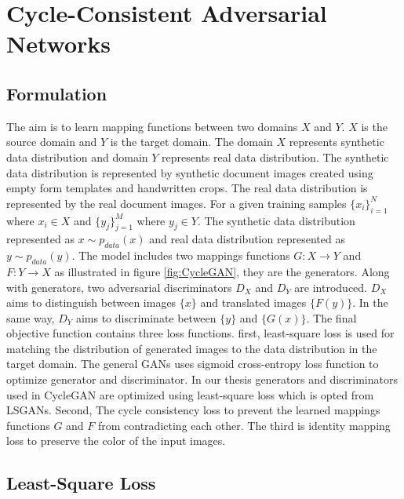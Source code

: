 \section{Cycle-Consistent Adversarial Networks}\label{CycleConsistentAdversarialNetworks}


\subsection{Formulation}


The aim is to learn mapping functions between two domains $X$ and $Y$. $X$ is the source domain and $Y$ is the target domain. The domain $X$ represents synthetic data distribution and domain $Y$ represents real data distribution. The synthetic data distribution is represented by synthetic document images created using empty form templates and handwritten crops. The real data distribution is represented by the real document images. For a given training samples $\{x_i\}_{i=1}^{N}$ where $x_i \in X$ and $\{y_j\}_{j=1}^{M}$ where $y_j \in Y$. The synthetic data distribution represented as $x \sim p_{data}(x)$ and real data distribution represented as $y \sim p_{data}(y)$. The model includes two mappings functions $G : X \rightarrow Y$ and $F : Y \rightarrow X$ as illustrated in figure \ref{fig:CycleGAN}, they are the generators. Along with generators, two adversarial discriminators $D_X$ and $D_Y$ are introduced. $D_X$ aims to distinguish between images $\{x\}$ and translated images $\{F(y)\}$. In the same way, $D_Y$ aims to discriminate between $\{y\}$ and $\{G(x)\}$.  The final objective function contains three loss functions. first, least-square loss\cite{mao2017squares} is used for matching the distribution of generated images to the data distribution in the target domain. The general \acp{GAN} uses sigmoid cross-entropy loss function to optimize generator and discriminator. In our thesis generators and discriminators used in \ac{CycleGAN} are optimized using least-square loss\cite{mao2017squares} which is opted from \acp{LSGAN}. Second, The cycle consistency loss to prevent the learned mappings functions $G$ and $F$ from contradicting each other\cite{zhu2020unpaired}. The third is identity mapping loss to preserve the color of the input images\cite{zhu2020unpaired}.


\subsection{Least-Square Loss}


